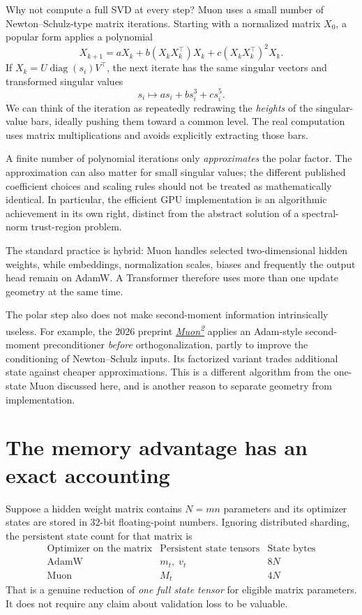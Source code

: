 Why not compute a full SVD at every step?  Muon uses a small number of Newton--Schulz-type matrix iterations.  Starting with a normalized matrix \(X_0\), a popular form applies a polynomial
\begin{equation}
 X_{k+1}=aX_k+b(X_kX_k^\top)X_k+
               c(X_kX_k^\top)^2X_k.
 \label{eq:N20261017-NS}
\end{equation}
If \(X_k=U\operatorname{diag}(s_i)V^\top\), the next iterate has the same singular vectors and transformed singular values
\[
 s_i\longmapsto a s_i+b s_i^3+c s_i^5.
\]
We can think of the iteration as repeatedly redrawing the \emph{heights} of the singular-value bars, ideally pushing them toward a common level.  The real computation uses matrix multiplications and avoids explicitly extracting those bars.

A finite number of polynomial iterations only \emph{approximates} the polar factor.  The approximation can also matter for small singular values; the different published coefficient choices and scaling rules should not be treated as mathematically identical.  In particular, the efficient GPU implementation is an algorithmic achievement in its own right, distinct from the abstract solution of a spectral-norm trust-region problem.

The standard practice is hybrid: Muon handles selected two-dimensional hidden weights, while embeddings, normalization scales, biases and frequently the output head remain on AdamW.  A Transformer therefore uses more than one update geometry at the same time.

The polar step also does not make second-moment information intrinsically useless.  For example, the 2026 preprint \href{https://arxiv.org/abs/2604.09967}{\emph{Muon\textsuperscript{2}}} applies an Adam-style second-moment preconditioner \emph{before} orthogonalization, partly to improve the conditioning of Newton--Schulz inputs.  Its factorized variant trades additional state against cheaper approximations.  This is a different algorithm from the one-state Muon discussed here, and is another reason to separate geometry from implementation.

\section{The memory advantage has an exact accounting}

Suppose a hidden weight matrix contains \(N=mn\) parameters and its optimizer states are stored in 32-bit floating-point numbers.  Ignoring distributed sharding, the persistent state count for that matrix is
\[
 \begin{array}{c|c|c}
 \text{Optimizer on the matrix}&\text{Persistent state tensors}&
      \text{State bytes}\\ \hline
 \text{AdamW}&m_t,\;v_t&8N\\
 \text{Muon}&M_t&4N
 \end{array}
\]
That is a genuine reduction of \emph{one full state tensor} for eligible matrix parameters.  It does not require any claim about validation loss to be valuable.

